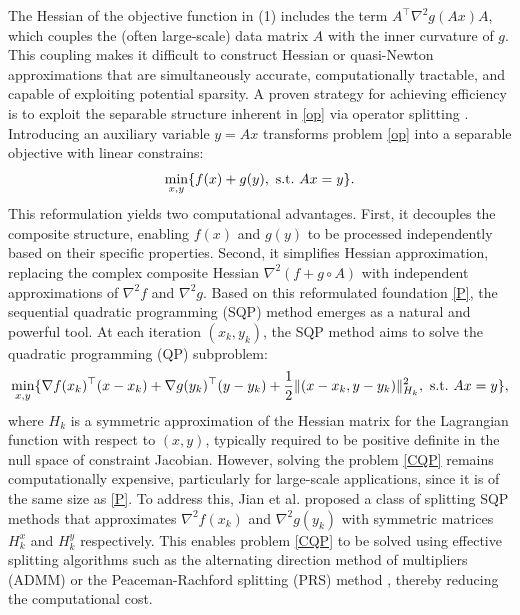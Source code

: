 \documentclass[pdflatex,sn-mathphys-num]{sn-jnl}%
\theoremstyle{thmstyleone}%
\theoremstyle{thmstyletwo}%
\theoremstyle{thmstylethree}%
\begin{document}
The Hessian of the objective function in (1) includes the term $A^\top\nabla^2g(Ax)A$, which couples the (often large-scale) data matrix $A$ with the inner curvature of $g$. This coupling makes it difficult to construct Hessian or quasi-Newton approximations that are simultaneously accurate, computationally tractable, and capable of exploiting potential sparsity. 	
A proven strategy for achieving efficiency is to exploit the separable structure inherent in \eqref{op} via operator splitting \cite{boyd11}. Introducing an auxiliary variable $y=Ax$ transforms problem \eqref{op} into a separable objective with linear constrains:
\begin{equation}\label{P}
	\min_{x, y}\{f(x)+g(y),\ {\rm s.t.}  \ A x=y\}.
\end{equation}
This reformulation yields two computational advantages. First, it decouples the composite structure, enabling $f(x)$ and $g(y)$ to be processed independently based on their specific properties. Second, it simplifies Hessian approximation, replacing the complex composite Hessian $\nabla^2(f+g\circ A)$ with independent approximations of $\nabla^2f$ and $\nabla^2g$.
Based on this reformulated foundation \eqref{P}, the sequential quadratic programming (SQP) method \cite{Wilson1963,FLT02,LMD16,AKR23,COR24} emerges as a natural and powerful tool. At each iteration $(x_k,y_k)$, the SQP method aims to solve the quadratic programming (QP) subproblem:
\begin{equation}\label{CQP}
	\min_{x,y}\{\nabla f(x_k)^{\top}(x-x_k)+\nabla g(y_k)^{\top}(y-y_k)+\frac{1}{2}\|(x-x_k, y-y_k)\|_{H_k}^2,~ 
	{\rm s.t.}~A x=y\},
\end{equation}
where $H_k$ is a symmetric approximation of the Hessian matrix for the Lagrangian function with respect to $(x, y)$, typically required to be positive definite in the null space of constraint Jacobian. 
However, solving the problem \eqref{CQP} remains computationally expensive, particularly for large-scale applications, since it is of the same size as \eqref{P}. To address this, Jian et al. \cite{JZY20,JLY21,JZY22,JMX24,JCT23} proposed a class of splitting SQP methods that approximates $\nabla^2 f(x_k)$ and $\nabla^2 g(y_k)$ with symmetric matrices $H_k^x$ and $H_k^y$ respectively. This enables problem \eqref{CQP} to be solved using effective splitting algorithms such as the alternating direction method of multipliers (ADMM) \cite{GM75} or the Peaceman-Rachford splitting (PRS) method \cite{PR55}, thereby reducing the computational cost. 
\end{document}
